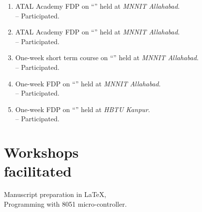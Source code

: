 \begin{enumerate}[label={\textbf{\arabic*}.\ }]
\item ATAL Academy FDP on ``” held at {\sl MNNIT Allahabad}.\\-- Participated.
\item ATAL Academy FDP on ``” held at {\sl MNNIT Allahabad}.\\-- Participated.
\item One-week short term course on ``” held at {\sl MNNIT Allahabad}.\\-- Participated.
\item One-week FDP on ``” held at {\sl MNNIT Allahabad}.\\-- Participated.
\item One-week FDP on ``” held at {\sl HBTU Kanpur}.\\-- Participated.
\end{enumerate}
\vspace{-2em}
\sectionline
\vspace{-2.5em}\section{Workshops\\ facilitated}
Manuscript preparation in LaTeX,\\ Programming with 8051 micro-controller.
\vspace{-1em}
\\\sectionline
